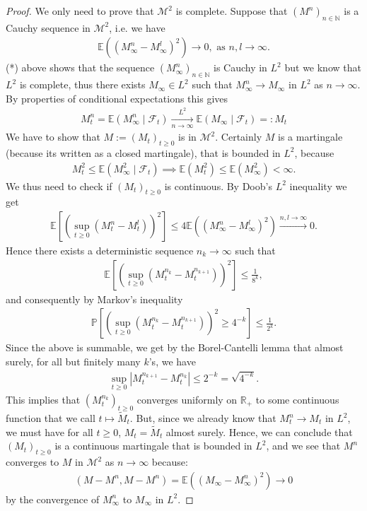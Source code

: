 \documentclass[../mainfile.tex]{subfiles}
\begin{document}
\begin{proof}
We only need to prove that $\mathcal{M}^2$ is complete. Suppose that $(M^n)_{n \in \mathbb{N}}$ is a Cauchy sequence in $\mathcal{M}^2$, i.e. we have 
\begin{align*}
\mathbb{E}((M_\infty^n-M_\infty^l)^2) \to 0, \text{ as } n,l \to \infty. \tag{*}
\end{align*}
(*) above shows that the sequence $(M_\infty^n)_{n \in \mathbb{N}}$ is Cauchy in $L^2$ but we know that $L^2$ is complete, thus there exists $M_\infty \in L^2$ such that $M_\infty^n \to M_\infty$ in $L^2$ as $n \to \infty$. By properties of conditional expectations this gives
\begin{align*}
M_t^n = \mathbb{E}( M_\infty^n \mid \mathcal{F}_t) \xrightarrow[n \to \infty]{L^2} \mathbb{E}(M_\infty \mid \mathcal{F}_t)=:M_t
\end{align*}
We have to show that $M:=(M_t)_{t \geq 0}$ is in $\mathcal{M}^2$. Certainly $M$ is a martingale (because its written as a closed martingale), that is bounded in $L^2$, because \begin{align*}
M_t^2 \leq \mathbb{E}(M_\infty^2 \mid \mathcal{F}_t) \implies \mathbb{E}(M_t^2) \leq \mathbb{E}(M_\infty^2) < \infty.
\end{align*}
We thus need to check if $(M_t)_{t \geq 0}$ is continuous. By Doob's $L^2$ inequality we get
\begin{align*}
\mathbb{E}[ (\sup_{t \geq 0} (M_t^n-M_t^l))^2] \leq 4 \mathbb{E}((M_\infty^n-M_\infty^l)^2) \xrightarrow{n,l \to \infty} 0. 
\end{align*}
Hence there exists a deterministic sequence $n_k \to \infty$ such that 
\begin{align*}
\mathbb{E}[(\sup_{t \geq 0} (M_t^{n_k}-M_t^{n_{k+1}}))^2] \leq \frac{1}{8^k},
\end{align*}
and consequently by Markov's inequality 
\begin{align*}
\mathbb{P}[ (\sup_{t \geq 0} ( M_t^{n_k}-M_t^{n_{k+1}}))^2 \geq 4^{-k}] \leq \frac{1}{2^k}.
\end{align*}
Since the above is summable, we get by the Borel-Cantelli lemma that almost surely, for all but finitely many $k$'s, we have 
\begin{align*}
\sup_{t \geq 0} | M_t^{n_{k+1}}-M_t^{n_k}| \leq 2^{-k} = \sqrt{4^{-k}}.
\end{align*}
This implies that $(M_t^{n_k})_{t \geq 0}$ converges uniformly on $\mathbb{R}_+$ to some continuous function that we call $t \mapsto \tilde{M}_t$. But, since we already know that $M_t^n \to M_t$ in $L^2$, we must have for all $t \geq 0$, $M_t= \tilde{M}_t$ almost surely.  Hence, we can conclude that $(M_t)_{t \geq 0}$ is a continuous martingale that is bounded in $L^2$, and we see that $M^n$ converges to $M$ in $\mathcal{M}^2$ as $n \to \infty$ because:
\begin{align*}
(M-M^n,M-M^n)=\mathbb{E}( (M_\infty-M_\infty^n)^2) \to 0 
\end{align*}
by the convergence of $M_\infty^n$ to $M_\infty$ in $L^2$. 
\end{proof}
\newpage
\end{document}
